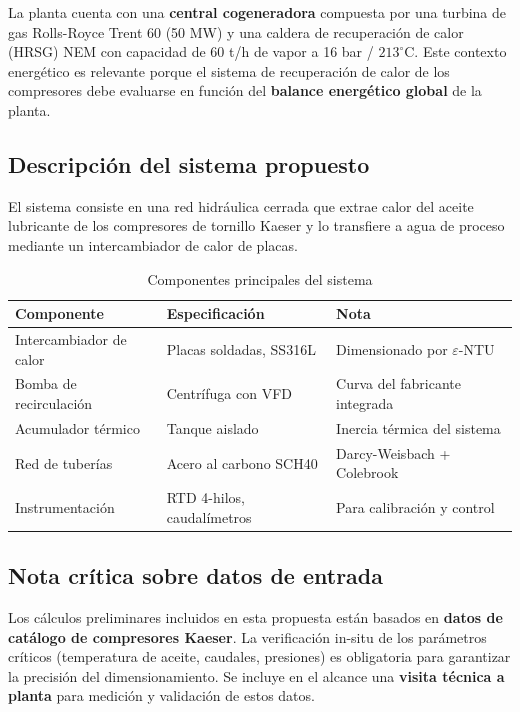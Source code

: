 \documentclass[11pt,a4paper]{article}
\begin{document}
La planta cuenta con una \textbf{central cogeneradora} compuesta por una turbina de gas Rolls-Royce Trent 60 (50 MW) y una caldera de recuperación de calor (HRSG) NEM con capacidad de 60 t/h de vapor a 16 bar / $213^\circ$C. Este contexto energético es relevante porque el sistema de recuperación de calor de los compresores debe evaluarse en función del \textbf{balance energético global} de la planta.

\subsection{Descripción del sistema propuesto}

El sistema consiste en una red hidráulica cerrada que extrae calor del aceite lubricante de los compresores de tornillo Kaeser y lo transfiere a agua de proceso mediante un intercambiador de calor de placas.

\begin{table}[H]
\centering
\caption{Componentes principales del sistema}
\begin{tabular}{@{}lll@{}}
\toprule
\textbf{Componente} & \textbf{Especificación} & \textbf{Nota} \\
\midrule
Intercambiador de calor & Placas soldadas, SS316L & Dimensionado por $\varepsilon$-NTU \\
Bomba de recirculación & Centrífuga con VFD & Curva del fabricante integrada \\
Acumulador térmico & Tanque aislado & Inercia térmica del sistema \\
Red de tuberías & Acero al carbono SCH40 & Darcy-Weisbach + Colebrook \\
Instrumentación & RTD 4-hilos, caudalímetros & Para calibración y control \\
\bottomrule
\end{tabular}
\end{table}

\subsection{Nota crítica sobre datos de entrada}

Los cálculos preliminares incluidos en esta propuesta están basados en \textbf{datos de catálogo de compresores Kaeser}. La verificación in-situ de los parámetros críticos (temperatura de aceite, caudales, presiones) es obligatoria para garantizar la precisión del dimensionamiento. Se incluye en el alcance una \textbf{visita técnica a planta} para medición y validación de estos datos.
\end{document}

